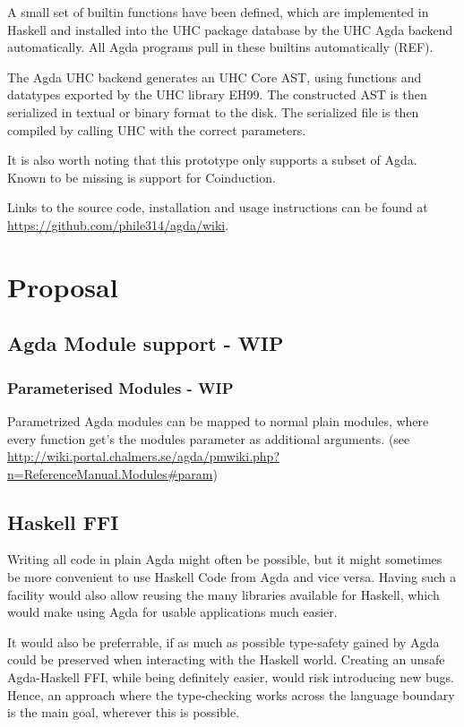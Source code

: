 \documentclass[12pt, a4paper, twoside]{report}
\begin{document}
A small set of builtin functions have been defined, which are implemented in Haskell
and installed into the UHC package database by the UHC Agda backend automatically.
All Agda programs pull in these builtins automatically (REF).

The Agda UHC backend generates an UHC Core AST, using functions and datatypes exported
by the UHC library EH99. The constructed AST is then serialized in textual or binary format
to the disk. The serialized file is then compiled by calling UHC with the correct parameters.

It is also worth noting that this prototype only supports a subset of Agda. Known to be
missing is support for Coinduction.

Links to the source code, installation and usage instructions can be found
at \url{https://github.com/phile314/agda/wiki}.

\chapter{Proposal}
\section{Agda Module support - WIP}
\subsection{Parameterised Modules - WIP}
Parametrized Agda modules can be mapped to normal plain modules, where every function get's the
modules parameter as additional arguments. (see \url{http://wiki.portal.chalmers.se/agda/pmwiki.php?n=ReferenceManual.Modules#param})

\section{Haskell FFI}
\label{sec:prop:hs-ffi}
Writing all code in plain Agda might often be possible, but it might sometimes be more
convenient to use Haskell Code from Agda and vice versa. Having such a facility would
also allow reusing the many libraries available for Haskell, which would make using Agda
for usable applications much easier.

It would also be preferrable, if as much as possible type-safety gained by Agda could be
preserved when interacting with the Haskell world. Creating an unsafe Agda-Haskell
FFI, while being definitely easier, would risk introducing new bugs. Hence, an approach
where the type-checking works across the language boundary is the main goal, wherever
this is possible.
\end{document}
